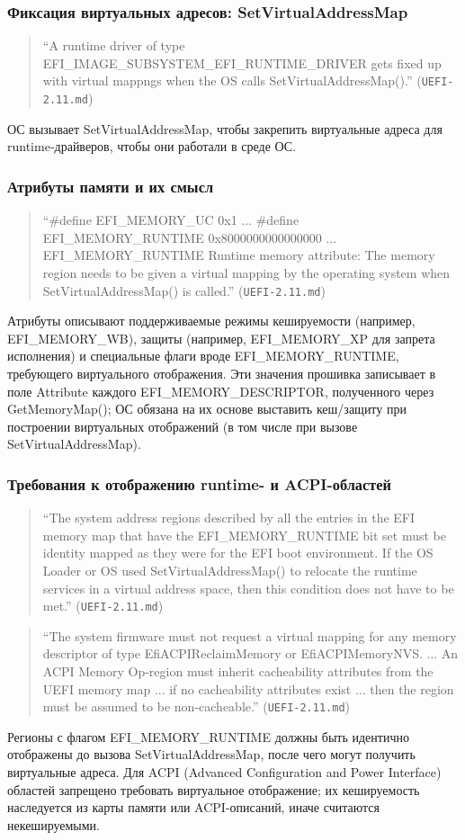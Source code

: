 \documentclass[a4paper,12pt]{article}
\begin{document}
\subsubsection{Фиксация виртуальных адресов: SetVirtualAddressMap}
\begin{quote}
``A runtime driver of type EFI\_IMAGE\_SUBSYSTEM\_EFI\_RUNTIME\_DRIVER gets fixed up with virtual mappngs when the OS calls SetVirtualAddressMap().'' (\texttt{UEFI-2.11.md})
\end{quote}
ОС вызывает SetVirtualAddressMap, чтобы закрепить виртуальные адреса для runtime‑драйверов, чтобы они работали в среде ОС.

\subsubsection{Атрибуты памяти и их смысл}
\begin{quote}
``\#define EFI\_MEMORY\_UC 0x1 ... \#define EFI\_MEMORY\_RUNTIME 0x8000000000000000 ... EFI\_MEMORY\_RUNTIME Runtime memory attribute: The memory region needs to be given a virtual mapping by the operating system when SetVirtualAddressMap() is called.'' (\texttt{UEFI-2.11.md})
\end{quote}
Атрибуты описывают поддерживаемые режимы кешируемости (например, EFI\_MEMORY\_WB), защиты (например, EFI\_MEMORY\_XP для запрета исполнения) и специальные флаги вроде EFI\_MEMORY\_RUNTIME, требующего виртуального отображения. Эти значения прошивка записывает в поле Attribute каждого EFI\_MEMORY\_DESCRIPTOR, полученного через GetMemoryMap(); ОС обязана на их основе выставить кеш/защиту при построении виртуальных отображений (в том числе при вызове SetVirtualAddressMap).
\subsubsection{Требования к отображению runtime- и ACPI-областей}
\begin{quote}
``The system address regions described by all the entries in the EFI memory map that have the EFI\_MEMORY\_RUNTIME bit set must be identity mapped as they were for the EFI boot environment. If the OS Loader or OS used SetVirtualAddressMap() to relocate the runtime services in a virtual address space, then this condition does not have to be met.'' (\texttt{UEFI-2.11.md})
\end{quote}
\begin{quote}
``The system firmware must not request a virtual mapping for any memory descriptor of type EfiACPIReclaimMemory or EfiACPIMemoryNVS. ... An ACPI Memory Op-region must inherit cacheability attributes from the UEFI memory map ... if no cacheability attributes exist ... then the region must be assumed to be non-cacheable.'' (\texttt{UEFI-2.11.md})
\end{quote}
Регионы с флагом EFI\_MEMORY\_RUNTIME должны быть идентично отображены до вызова SetVirtualAddressMap, после чего могут получить виртуальные адреса. Для ACPI (Advanced Configuration and Power Interface) областей запрещено требовать виртуальное отображение; их кешируемость наследуется из карты памяти или ACPI-описаний, иначе считаются некешируемыми.
\end{document}
